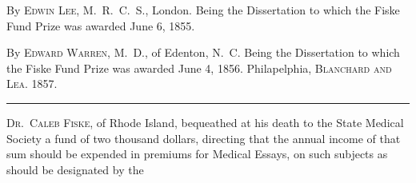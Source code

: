 \footnotesize
{}  By \textsc{Edwin Lee, M.~R.~C.~S.}, London. Being the Dissertation to which the Fiske Fund Prize was awarded June 6, 1855.

  By \textsc{Edward Warren, M.~D.}, of Edenton, N.~C. Being the Dissertation to which the Fiske Fund Prize was awarded June 4, 1856. Philapelphia, \textsc{Blanchard and Lea}. 1857.
\plainbreak{1}

\normalsize

\lettrine[lines=1]{}{Dr.~Caleb Fiske}, of Rhode Island, bequeathed at his death to the
State Medical Society a fund of two thousand dollars, directing that
the annual income of that sum should be expended in premiums for
Medical Essays, on such subjects as should be designated by the\endinput
